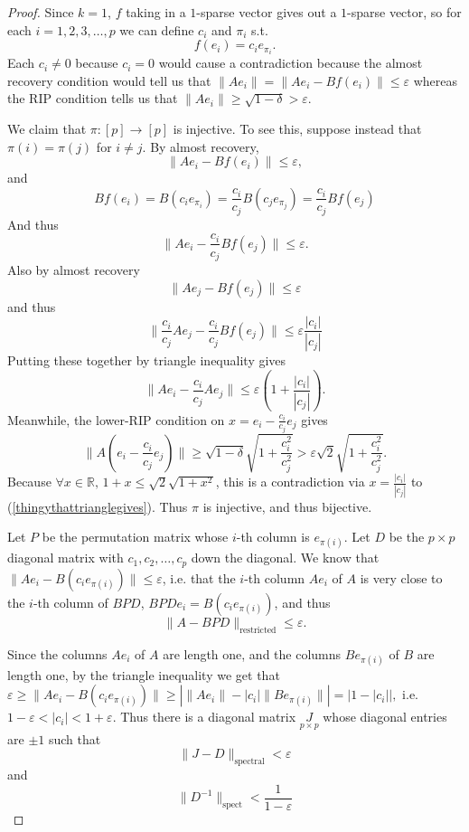 \documentclass[11pt]{amsart}
\begin{document}
\begin{proof}
Since $k=1$, $f$ taking in a $1$-sparse vector gives out a $1$-sparse vector, so for each $i=1,2,3,\ldots, p$ we can define $c_i$ and $\pi_i$ s.t.
\[f(e_i)=c_i e_{\pi_i}.\]  Each $c_i\neq 0$ because $c_i=0$ would cause a contradiction because the almost recovery condition 
would tell us that $\|Ae_i\|=\|Ae_i-Bf(e_i)\|\leq \varepsilon$ whereas the RIP condition tells us that $\|Ae_i\|\geq \sqrt{1-\delta}>\varepsilon$. 

We claim that $\pi:[p]\rightarrow [p]$ is injective.  To see this, suppose instead that $\pi(i)=\pi(j)$ for $i\neq j$.
By almost recovery, \[\|Ae_i-Bf(e_i)\|\leq \varepsilon,\] and \[Bf(e_i)=B(c_ie_{\pi_i})=\frac{c_i}{c_j} B(c_je_{\pi_j})=\frac{c_i}{c_j} Bf(e_j)\] 
And thus \[\|Ae_i-\frac{c_i}{c_j} Bf(e_j)\|\leq \varepsilon.\]  Also by almost recovery  
\[\|Ae_j-Bf(e_j)\|\leq \varepsilon\] and thus
\[\|\frac{c_i}{c_j}Ae_j-\frac{c_i}{c_j}Bf(e_j)\|\leq \varepsilon \frac{|c_i|}{|c_j|}\] 
Putting these together by triangle inequality gives
\begin{equation}\label{thingythattrianglegives}
\|Ae_i-\frac{c_i}{c_j}Ae_j\| \leq \varepsilon(1+ \frac{|c_i|}{|c_j|}).
\end{equation}
Meanwhile, the lower-RIP condition on $x=e_i- \frac{c_i}{c_j}e_j$ gives
 \[\|A(e_i- \frac{c_i}{c_j}e_j)\|\geq \sqrt{1-\delta} \sqrt{1+\frac{c_i^2}{c_j^2}} > \varepsilon \sqrt{2} \sqrt{1+\frac{c_i^2}{c_j^2}}.\]
 Because $\forall x\in \mathbb{R},\, 1+x\leq \sqrt{2}\sqrt{1+x^2}$, this is a contradiction via $x=\frac{|c_i|}{|c_j|}$ to 
 (\ref{thingythattrianglegives}).  Thus $\pi$ is injective, and thus bijective. 

Let $P$ be the permutation matrix whose $i$-th column is $e_{\pi(i)}$.  Let $D$ be the $p \times p$ diagonal matrix with 
$c_1,c_2, \ldots, c_p$ down the diagonal.  We know that $\|Ae_i-B(c_ie_{\pi(i)})\|\leq \varepsilon$, i.e. that the  $i$-th column $Ae_i$ of $A$ is very close to the $i$-th column of
$BPD$, $BPDe_i=B(c_ie_{\pi(i)})$, and thus
\[\|A-BPD\|_\text{restricted}\leq \varepsilon.\] 

Since the columns $Ae_i$ of $A$ are length one, and the columns $Be_{\pi(i)}$ of $B$ are length one, by the triangle inequality
we get that  $\varepsilon \geq \|Ae_i-B(c_ie_{\pi(i)})\| \geq \left| \|Ae_i\|-|c_i| \|Be_{\pi(i)}\| \right|=|1-|c_i||,$
i.e.  $1-\varepsilon < |c_i| < 1+ \varepsilon$. Thus there is a diagonal matrix $\underset{p\times p}{J}$ whose diagonal
entries are $\pm1$ such that 
 \begin{equation} 
 \|J-D\|_\text{spectral}<\varepsilon
 \end{equation}
 and 
\begin{equation}
\|D^{-1}\|_\text{spect}<\frac{1}{1-\varepsilon}
\end{equation}
 \end{proof}
\end{document}
